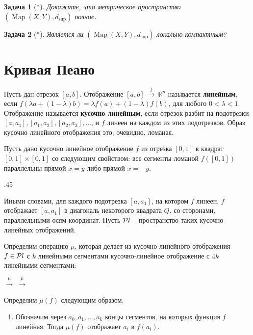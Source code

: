 \documentclass[12pt]{book}
\newcommand{\subs}{\section}
\newcommand{\arrow}{{\:\longrightarrow\:}}
\def\Map{\operatorname{Map}}
\def\R{{\mathbb R}}
\theoremstyle{upshape}
\newtheorem{zadacha}{Задача}[chapter]
\theoremstyle{generic}
\theoremstyle{upshapenonumber}
\newtheorem{ukazanie}{Указание}[section]
\renewcommand{\labelenumi}{\ralph{enumi}.}
\newcommand{\следствие}{%
     \refstepcounter{teorema}
     {\noindent\bf Следствие \thechapter.\arabic{teorema}:\ }}
\newcommand{\пример}{%
     \refstepcounter{teorema}
     {\noindent\bf Пример \thechapter.\arabic{teorema}:\ }}
\newcommand{\лемма}{%
     \refstepcounter{teorema}
     {\noindent\bf Лемма \thechapter.\arabic{teorema}:\ }}
\newcommand{\теорема}{%
     \refstepcounter{teorema}
     {\noindent\bf Теорема \thechapter.\arabic{teorema}:\ }}
\newcommand{\утверждение}{%
     \refstepcounter{teorema}
     {\noindent\bf Утверждение \thechapter.\arabic{teorema}:\ }}
\begin{document}
{\begin{zadacha}[*]
Докажите, что метрическое пространство $(\Map(X,Y),d_{\sup})$ полное.
\end{zadacha}

%
%

\begin{zadacha}[*]
Является ли $(\Map(X,Y),d_{\sup})$ локально компактным?
\end{zadacha}

\subs{Кривая Пеано}

Пусть дан отрезок $[a,b]$. Отображение
$[a,b] \overset{f}{\arrow} \R^n$ называется {\bf линейным},
если $f (\lambda a + (1-\lambda) b)= \lambda f (a) +(1-\lambda) f(b)$,
для любого $0<\lambda<1$. Отображение называется
{\bf кусочно линейным}, если отрезок разбит
на подотрезки $[a, a_1], [a_1, a_2], [a_2, a_3], \ldots$,
и $f$ линеен на каждом из этих подотрезков.
Образ кусочно линейного отображения это, очевидно,
ломаная. 

Пусть дано кусочно линейное
отображение $f$ из отрезка $[0, 1]$ в квадрат
$[0, 1]\times [0, 1]$ со следующим свойством:
все сегменты ломаной $f([0, 1])$ параллельны
прямой $x=y$ либо прямой $x=-y$.
\begin{center}
\epsfxsize .45\linewidth
{}
\end{center}
Иными словами, для каждого подотрезка 
$[a, a_1]$, на котором $f$ линеен, $f$ отображает
$[a, a_1]$ в диагональ некоторого квадрата $Q$, со сторонами,
параллельными осям координат. Пусть ${\cal P}l$ --
пространство таких кусочно-линейных отображений.

Определим операцию $\mu$, которая делает из
кусочно-линейного отображения $f\in {\cal P}l$ с
$k$ линейными сегментами кусочно-линейное отображение
с $4k$ линейными сегментами:
\begin{center}
$\overset{\mu}{\longrightarrow}$
$\overset{\mu}{\longrightarrow}$
\end{center}
Определим $\mu(f)$ следующим образом.
\begin{enumerate}
\renewcommand{\labelenumi}{\arabic{enumi}.}
\item Обозначим через $a_0, a_1, \dots, a_k$ 
концы сегментов, на которых функция $f$ линейная.
Тогда $\mu(f)$ отображает $a_i$ в $f(a_i)$.


\end{enumerate}}
\end{document}
